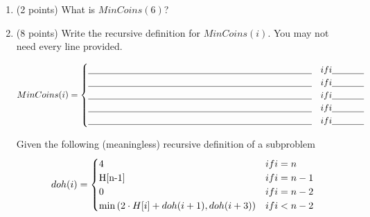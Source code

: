 \documentclass[11pt]{article}
\begin{document}
\begin{enumerate}
\newpage


\begin{center}
\LARGE\textbf{Section 4 (Backtracking and 1D Dynamic Programming)\\}%
\end{center}

    In your country, there are only coins of denominations 1, 3, and 4. You
    would like to write an algorithm to solve the following problem: Given a
    positive integer $n$, what is the fewest number of coins you can use to
    represent $n$?

    To solve this problem, you choose the following English definition of the recursive subproblems.

     \textbf{Let $MinCoins(i)$ be the minimum number of coins needed to represent the amount $i$.}

     \item (2 points) What is $MinCoins(6)$?

     \vspace{1in}

     \item (8 points) Write the recursive definition for $MinCoins(i)$. You may not need every line provided.

    \begin{equation*}
        MinCoins(i) =
        \begin{cases}
        \underline{\hspace{3.5in}} & if i \underline{\hspace{.5in}} \\
        \underline{\hspace{3.5in}} & if i \underline{\hspace{.5in}} \\
        \underline{\hspace{3.5in}} & if i \underline{\hspace{.5in}} \\
        \underline{\hspace{3.5in}} & if i \underline{\hspace{.5in}} \\
        \underline{\hspace{3.5in}} & if i \underline{\hspace{.5in}} \\
        \end{cases}
    \end{equation*}
    \newpage

    Given the following (meaningless) recursive definition of a subproblem
\begin{equation*}
    doh(i) =
    \begin{cases}
        4 & if i = n \\
        $H[n-1]$ & if i = n-1\\
        0 & if i = n-2\\
        \min \left(2\cdot H[i] + doh(i+1), doh(i+3)\right) & if i < n-2 \\


\end{cases}
\end{equation*}
\end{enumerate}
\end{document}
